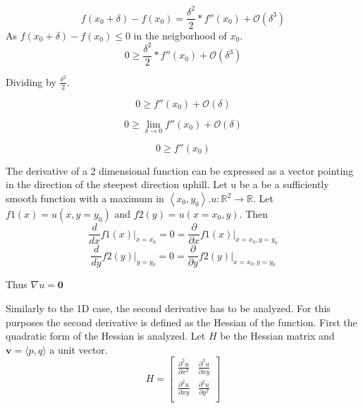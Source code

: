 \documentclass{article}
\begin{document}
\begin{equation*}
    f(x_{0}+\delta) - f(x_{0}) = \frac{\delta^2}{2}*f''(x_{0}) + \mathcal{O}(\delta^3)
\end{equation*}
 As $f(x_{0}+\delta) - f(x_{0}) \leq 0$ in the neigborhood of $x_{0}$.
\begin{equation*}
    0 \geq \frac{\delta^2}{2}*f''(x_{0}) + \mathcal{O}(\delta^3)
\end{equation*}

Dividing by $\frac{\delta^2}{2}$.

\begin{equation*}
    0 \geq f''(x_{0}) + \mathcal{O}(\delta)
\end{equation*}

\begin{equation*}
    0 \geq \lim_{\delta \to 0} f''(x_{0}) + \mathcal{O}(\delta)
\end{equation*}

\begin{equation*}
    0 \geq f''(x_{0})
\end{equation*}

The derivative of a 2 dimensional function can be expressed as a vector pointing in the direction of the steepest direction uphill.
Let u be a be a sufficiently smooth function with a maximum in $ \left<x_{0}, y_{0}\right> $.$ u: \mathbb{R}^{2} \to \mathbb{R} $.
Let $f1(x) = u(x,y=y_{0})$ and $f2(y) = u(x=x_{0},y)$. Then
\begin{equation*}
    \frac{d}{dx}f1(x)\bigg|_{x=x_{0}} = 0 = \frac{\partial}{\partial x}f1(x)\bigg|_{x=x_{0},y=y_{0}}
\end{equation*}{}
\begin{equation*}
    \frac{d}{dy}f2(y)\bigg|_{y=y_{0}} = 0 = \frac{\partial}{\partial y}f2(y)\bigg|_{x=x_{0},y=y_{0}}
\end{equation*}{}

Thus $\nabla u = \mathbf{0}$

Similarly to the 1D case, the second derivative has to be analyzed. For this purposes the second derivative is defined as the Hessian of the function.
First the quadratic form of the Hessian is analyzed. Let $H$ be the Hessian matrix and $\mathbf{v}=\langle p, q\rangle$ a unit vector.
\begin{equation*}
 H = \begin{bmatrix}
      \frac{\partial^2 u}{\partial x^2} & \frac{\partial^2 u}{\partial xy}\\
      \frac{\partial^2 u}{\partial xy} & \frac{\partial^2 u}{\partial y^2}\\
    \end{bmatrix}
\end{equation*}
\end{document}
